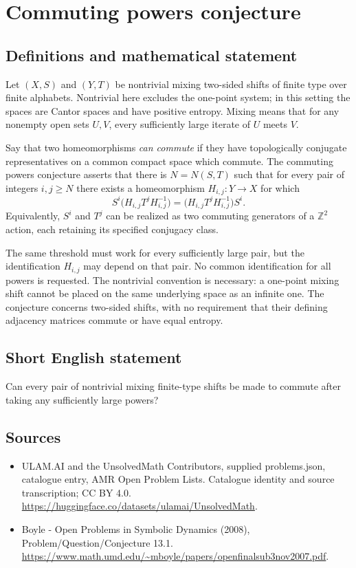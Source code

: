 \documentclass[11pt,a4paper]{article}
\begin{document}
\section*{Commuting powers conjecture}\label{statement}

\subsection{Definitions and mathematical statement}
Let $(X,S)$ and $(Y,T)$ be nontrivial mixing two-sided shifts of finite
type over finite alphabets. Nontrivial here excludes the one-point system;
in this setting the spaces are Cantor spaces and have positive entropy.
Mixing means that for any nonempty open sets $U,V$, every sufficiently
large iterate of $U$ meets $V$.

Say that two homeomorphisms \emph{can commute} if they have topologically
conjugate representatives on a common compact space which commute.
The commuting powers conjecture asserts that there is $N=N(S,T)$ such
that for every pair of integers $i,j\ge N$ there exists a homeomorphism
$H_{i,j}:Y\to X$ for which
\[
 S^i\bigl(H_{i,j}T^jH_{i,j}^{-1}\bigr)
   =\bigl(H_{i,j}T^jH_{i,j}^{-1}\bigr)S^i.
\]
Equivalently, $S^i$ and $T^j$ can be realized as two commuting generators
of a $\mathbb Z^2$ action, each retaining its specified conjugacy class.

The same threshold must work for every sufficiently large pair, but the
identification $H_{i,j}$ may depend on that pair. No common identification
for all powers is requested. The nontrivial convention is necessary:
a one-point mixing shift cannot be placed on the same underlying space
as an infinite one. The conjecture concerns two-sided shifts, with no
requirement that their defining adjacency matrices commute or have equal
entropy.
\subsection{Short English statement}
Can every pair of nontrivial mixing finite-type shifts be made to commute after taking any sufficiently large powers?
\subsection{Sources}
\begin{itemize}
\item[S1] ULAM.AI and the UnsolvedMath Contributors, supplied problems.json, catalogue entry, AMR Open Problem Lists. Catalogue identity and source transcription; CC BY 4.0.
\url{https://huggingface.co/datasets/ulamai/UnsolvedMath}.
\item[S2] Boyle - Open Problems in Symbolic Dynamics (2008), Problem/Question/Conjecture 13.1. 
\url{https://www.math.umd.edu/~mboyle/papers/openfinalsub3nov2007.pdf}.
\end{itemize}
\end{document}
